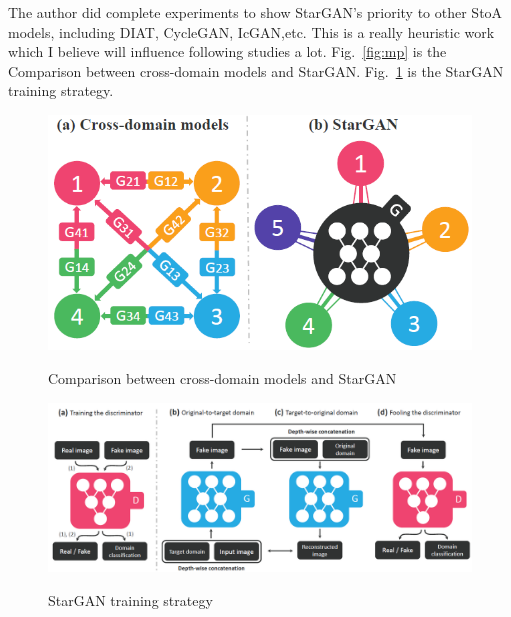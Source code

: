 \documentclass[]{IEEEtran}
\begin{document}
	The author did complete experiments to show StarGAN's priority to other StoA models, including DIAT, CycleGAN, IcGAN,etc. This is a really heuristic work which I believe will influence following studies a lot. Fig.~\ref{fig:mp} is the Comparison between cross-domain models and StarGAN. Fig.~\ref{fig:ss} is the StarGAN training strategy.
	


\newpage
\begin{figure}[!hbt]
		\vspace{1.7cm}
		\begin{center}
			\includegraphics[width=\columnwidth]{ff}
			\caption{Comparison between cross-domain models and StarGAN}
			\label{fig:mp}
		    \hspace{0.5cm}
			\includegraphics[width=\columnwidth]{ts}
			\caption{StarGAN training strategy}
			\label{fig:ss}
		\end{center}
	\end{figure}
\end{document}
